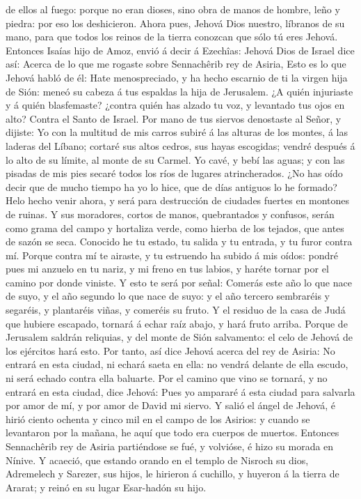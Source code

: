 de ellos al fuego: porque no eran dioses, sino obra de manos de hombre,
leño y piedra: por eso los deshicieron.  Ahora pues, Jehová
Dios nuestro, líbranos de su mano, para que todos los reinos de la
tierra conozcan que sólo tú eres Jehová.  Entonces Isaías
hijo de Amoz, envió á decir á Ezechîas: Jehová Dios de Israel dice así:
Acerca de lo que me rogaste sobre Sennachêrib rey de Asiria,
 Esto es lo que Jehová habló de él: Hate menospreciado, y
ha hecho escarnio de ti la virgen hija de Sión: meneó su cabeza á tus
espaldas la hija de Jerusalem.  ¿A quién injuriaste y á
quién blasfemaste? ¿contra quién has alzado tu voz, y levantado tus ojos
en alto? Contra el Santo de Israel.  Por mano de tus
siervos denostaste al Señor, y dijiste: Yo con la multitud de mis carros
subiré á las alturas de los montes, á las laderas del Líbano; cortaré
sus altos cedros, sus hayas escogidas; vendré después á lo alto de su
límite, al monte de su Carmel.  Yo cavé, y bebí las aguas;
y con las pisadas de mis pies secaré todos los ríos de lugares
atrincherados.  ¿No has oído decir que de mucho tiempo ha
yo lo hice, que de días antiguos lo he formado? Helo hecho venir ahora,
y será para destrucción de ciudades fuertes en montones de ruinas.
 Y sus moradores, cortos de manos, quebrantados y confusos,
serán como grama del campo y hortaliza verde, como hierba de los
tejados, que antes de sazón se seca.  Conocido he tu
estado, tu salida y tu entrada, y tu furor contra mí. 
Porque contra mí te airaste, y tu estruendo ha subido á mis oídos:
pondré pues mi anzuelo en tu nariz, y mi freno en tus labios, y haréte
tornar por el camino por donde viniste.  Y esto te será por
señal: Comerás este año lo que nace de suyo, y el año segundo lo que
nace de suyo: y el año tercero sembraréis y segaréis, y plantaréis
viñas, y comeréis su fruto.  Y el residuo de la casa de
Judá que hubiere escapado, tornará á echar raíz abajo, y hará fruto
arriba.  Porque de Jerusalem saldrán reliquias, y del monte
de Sión salvamento: el celo de Jehová de los ejércitos hará esto.
 Por tanto, así dice Jehová acerca del rey de Asiria: No
entrará en esta ciudad, ni echará saeta en ella: no vendrá delante de
ella escudo, ni será echado contra ella baluarte.  Por el
camino que vino se tornará, y no entrará en esta ciudad, dice Jehová:
 Pues yo ampararé á esta ciudad para salvarla por amor de
mí, y por amor de David mi siervo.  Y salió el ángel de
Jehová, é hirió ciento ochenta y cinco mil en el campo de los Asirios: y
cuando se levantaron por la mañana, he aquí que todo era cuerpos de
muertos.  Entonces Sennachêrib rey de Asiria partiéndose se
fué, y volvióse, é hizo su morada en Nínive.  Y acaeció,
que estando orando en el templo de Nisroch su dios, Adremelech y
Sarezer, sus hijos, le hirieron á cuchillo, y huyeron á la tierra de
Ararat; y reinó en su lugar Esar-hadón su hijo.

